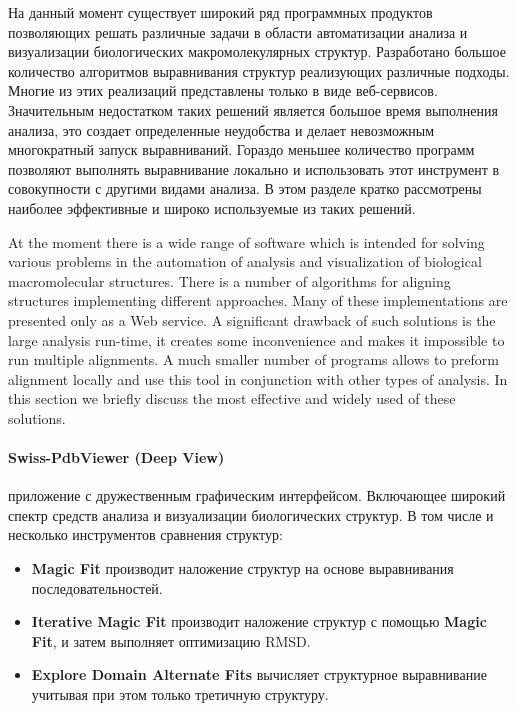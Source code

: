 \documentclass[a4paper, 12pt, titlepage, utf8]{extarticle}
\begin{document}
\begin{original}
На данный момент существует широкий ряд программных продуктов позволяющих решать
различные задачи в области автоматизации анализа и визуализации биологических
макромолекулярных структур. Разработано большое количество алгоритмов
выравнивания структур реализующих различные подходы. Многие из этих реализаций
представлены только в виде веб-сервисов. Значительным недостатком таких решений
является большое время выполнения анализа, это создает определенные неудобства и
делает невозможным многократный запуск выравниваний. Гораздо меньшее количество
программ позволяют выполнять выравнивание локально и использовать этот
инструмент в совокупности с другими видами анализа. В этом разделе кратко
рассмотрены наиболее эффективные и широко используемые из таких решений.
\begin{original}

At the moment there is a wide range of software which is intended for solving
various problems in the automation of analysis and visualization of biological
macromolecular structures. There is a number of algorithms for aligning
structures implementing different approaches. Many of these implementations are
presented only as a Web service. A significant drawback of such solutions is the
large analysis run-time, it creates some inconvenience and makes it impossible
to run multiple alignments. A much smaller number of programs allows to preform
alignment locally and use this tool in conjunction with other types of analysis.
In this section we briefly discuss the most effective and widely used of these
solutions.

\paragraph{Swiss-PdbViewer (Deep View) \cite{deep-view}}
\begin{original}
приложение с дружественным графическим интерфейсом. Включающее широкий спектр
средств анализа и визуализации биологических структур. В том числе и несколько
инструментов сравнения структур:
\begin{itemize}
    \item \textbf{Magic Fit} производит наложение структур на основе
выравнивания последовательностей.
    \item \textbf{Iterative Magic Fit} производит наложение структур с помощью
\textbf{Magic Fit}, и затем выполняет оптимизацию RMSD.
    \item \textbf{Explore Domain Alternate Fits} вычисляет структурное
выравнивание учитывая при этом только третичную структуру.
\end{itemize}
\end{original}


\end{original}
\end{original}
\end{document}
